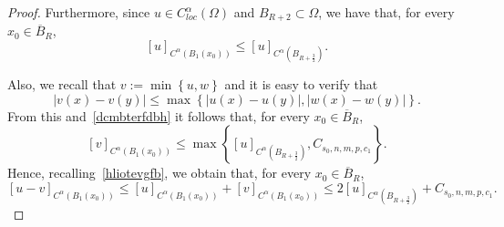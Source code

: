 \documentclass[12pt]{article}
\numberwithin{equation}{section}
\renewcommand{\leq}{\leqslant}
\begin{document}
\begin{appendix}
\begin{proof}
Furthermore, since $u\in C_{\textit{loc}}^\alpha(\Omega)$ and $B_{R+2}\subset\Omega$, we have that,
for every $x_0\in \overline{B}_R$,
\begin{equation}\label{horoitvcfe}
\left[u\right]_{C^\alpha(B_1(x_0))}\leq \left[u\right]_{C^\alpha\left(B_{R+\frac{3}{2}}\right)}.
\end{equation} 

Also, we recall that $v:=\min\left\lbrace u,w \right\rbrace$ and it is easy to verify that 
\begin{equation*}
\left|v(x)-v(y)\right|\leq \max\left\lbrace \left|u(x)-u(y)\right|, \left|w(x)-w(y)\right|\right\rbrace.
\end{equation*}
From this and~\eqref{dcmbterfdbh} it follows that, for every $x_0\in \overline{B}_R$,
\begin{equation}\label{hliotevgfb}
\left[v\right]_{C^{\alpha}(B_1(x_0))}\leq \max \left\lbrace  \left[u\right]_{C^\alpha\left(B_{R+\frac{3}{2}}\right)}, C_{s_0,n,m,p,c_1} \right\rbrace.
\end{equation}
Hence, recalling~\eqref{hliotevgfb}, we obtain that, for every $x_0\in \overline{B}_R$,
\begin{equation}\label{vnvcd-67123}
\left[u-v\right]_{C^\alpha(B_1(x_0))}\leq \left[u\right]_{C^\alpha(B_1(x_0))} +\left[v\right]_{C^\alpha(B_1(x_0))}\leq 2 \left[u\right]_{C^\alpha\left(B_{R+\frac{3}{2}}\right)}+C_{s_0,n,m,p,c_1}.
\end{equation}


\end{proof}
\end{appendix}
\end{document}
